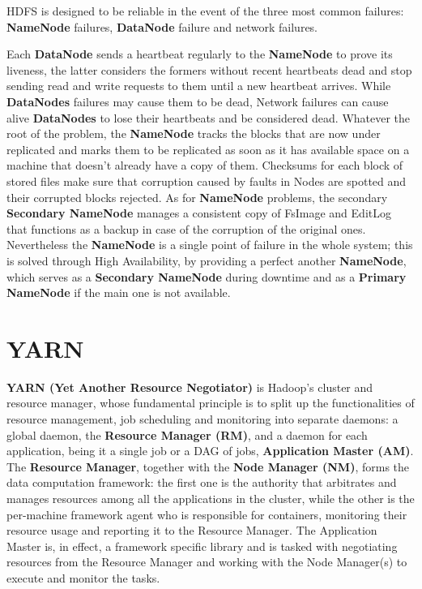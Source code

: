 HDFS is designed to be reliable in the event of the three most common failures: \textbf{NameNode} failures, \textbf{DataNode} failure and network failures.

Each \textbf{DataNode} sends a heartbeat regularly to the \textbf{NameNode} to prove its liveness, the latter considers the formers without recent heartbeats dead and stop sending read and write requests to them until a new heartbeat arrives.\newline
While \textbf{DataNodes} failures may cause them to be dead, Network failures can cause alive \textbf{DataNodes} to lose their heartbeats and be considered dead.\newline
Whatever the root of the problem, the \textbf{NameNode} tracks the blocks that are now under replicated and marks them to be replicated as soon as it has available space on a machine that doesn't already have a copy of them.\newline
Checksums for each block of stored files make sure that corruption caused by faults in Nodes are spotted and their corrupted blocks rejected.\newline
As for \textbf{NameNode} problems, the secondary \textbf{Secondary NameNode} manages a consistent copy of FsImage and EditLog that functions as a backup in case of the corruption of the original ones. Nevertheless the \textbf{NameNode} is a single point of failure in the whole system; this is solved through High Availability, by providing a perfect another \textbf{NameNode}, which serves as a \textbf{Secondary NameNode} during downtime and as a \textbf{Primary NameNode} if the main one is not available.

\pagebreak
\section{YARN} \label{YARN}

\textbf{YARN (Yet Another Resource Negotiator)} \cite{hadoop_doc} is Hadoop's cluster and resource manager, whose fundamental principle is to split up the functionalities of resource management, job scheduling and monitoring into separate daemons: a global daemon, the \textbf{Resource Manager (RM)}, and a daemon for each application, being it a single job or a DAG of jobs, \textbf{Application Master (AM)}.
\newline\newline
The \textbf{Resource Manager}, together with the \textbf{Node Manager (NM)}, forms the data computation framework: the first one is the authority that arbitrates and manages resources among all the applications in the cluster, while the other is the per-machine framework agent who is responsible for containers, monitoring their resource usage and reporting it to the Resource Manager.
\newline\newline
The Application Master is, in effect, a framework specific library and is tasked with negotiating resources from the Resource Manager and working with the Node Manager(s) to execute and monitor the tasks.

